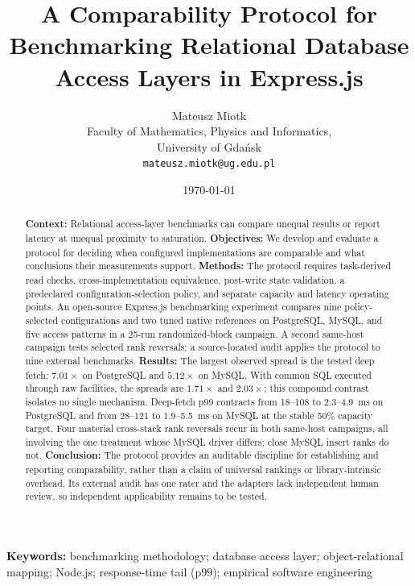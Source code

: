 \documentclass[12pt,a4paper]{article}
\title{A Comparability Protocol for Benchmarking Relational Database\\
  Access Layers in Express.js}
\author{Mateusz Miotk\\
  Faculty of Mathematics, Physics and Informatics,\\
  University of Gdańsk\\
  \texttt{mateusz.miotk@ug.edu.pl}}
\date{\today}
\begin{document}
\maketitle

\begin{abstract}
\noindent\textbf{Context:} Relational access-layer benchmarks can compare unequal
results or report latency at unequal proximity to saturation.
\textbf{Objectives:} We develop and evaluate a protocol for deciding when
configured implementations are comparable and what conclusions their measurements
support.
\textbf{Methods:} The protocol requires task-derived read checks,
cross-implementation equivalence, post-write state validation, a predeclared
configuration-selection policy, and separate capacity and latency operating
points. An open-source Express.js benchmarking experiment compares nine policy-selected configurations
and two tuned native references on PostgreSQL, MySQL, and five access patterns in a
25-run randomized-block campaign. A second same-host campaign tests selected rank
reversals; a source-located audit applies the protocol to nine external benchmarks.
\textbf{Results:} The largest observed spread is the tested deep fetch:
$7.01\times$ on PostgreSQL and $5.12\times$ on MySQL. With common SQL executed
through raw facilities, the spreads are $1.71\times$ and $2.03\times$; this
compound contrast isolates no single mechanism. Deep-fetch p99 contracts from
18--108 to 2.3--4.9~ms on PostgreSQL and from 28--121 to 1.9--5.5~ms on MySQL at
the stable 50\% capacity target. Four material cross-stack rank reversals recur in
both same-host campaigns, all involving the one treatment whose MySQL driver differs; close
MySQL insert ranks do not.
\textbf{Conclusion:} The protocol provides an auditable discipline for
establishing and reporting comparability, rather than a claim of universal
rankings or library-intrinsic overhead. Its external audit has one rater and the
adapters lack independent human review, so independent applicability remains to
be tested.
\end{abstract}

\vspace{0.5em}
\noindent\textbf{Keywords:} benchmarking methodology; database access layer; object-relational mapping;
Node.js; response-time tail (p99); empirical software engineering

\newcommand{\tabledir}{tables/}
\end{document}
